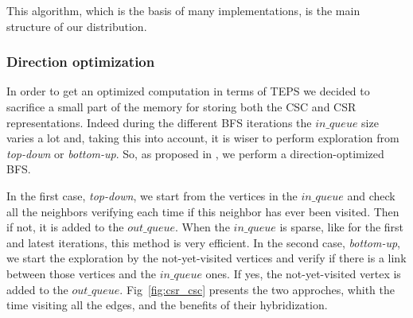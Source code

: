 This algorithm, which is the basis of many implementations, is the main structure of our distribution. 

\subsubsection{Direction optimization}

In order to get an optimized computation in terms of TEPS we decided to sacrifice a small part of the memory for storing both the CSC and CSR representations. 
Indeed during the different BFS iterations the $in\_queue$ size varies a lot and, taking this into account, it is wiser to perform exploration from \textit{top-down} or \textit{bottom-up}. 
So, as proposed in \cite{beamer2013direction}, we perform a direction-optimized BFS.

In the first case, \textit{top-down}, we start from the vertices in the $in\_queue$ and check all the neighbors verifying each time if this neighbor has ever been visited. 
Then if not, it is added to the $out\_queue$. 
When the $in\_queue$ is sparse, like for the first and latest iterations, this method is very efficient. 
In the second case, \textit{bottom-up}, we start the exploration by the not-yet-visited vertices and verify if there is a link between those vertices and the $in\_queue$ ones. 
If yes, the not-yet-visited vertex is added to the $out\_queue$. 
Fig~\ref{fig:csr_csc} presents the two approches, whith the time visiting all the edges, and the benefits of their hybridization.


